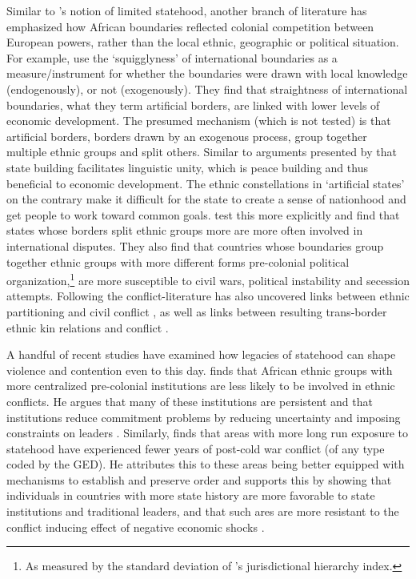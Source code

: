 
Similar to \citet{Clapham1996}'s notion of limited statehood, another branch of
literature has emphasized how African boundaries reflected colonial competition
between European powers, rather than the local ethnic, geographic or political
situation. For example, \citet{Alesina2011} use the `squigglyness' of
international boundaries as a measure/instrument for whether the boundaries were
drawn with local knowledge (endogenously), or not (exogenously). They find that
straightness of international boundaries, what they term artificial borders, are
linked with lower levels of economic development. The presumed mechanism (which
is not tested) is that artificial borders, borders drawn by an exogenous
process, group together multiple ethnic groups and split others. Similar to
arguments presented by \citet{Wimmer_2018} that state building facilitates
linguistic unity, which is peace building and thus beneficial to economic
development. The ethnic constellations in `artificial states' on the contrary
make it difficult for the state to create a sense of nationhood and get people
to work toward common goals. \citet{Englebert2002} test this more explicitly and
find that states whose borders split ethnic groups more are more often involved
in international disputes. They also find that countries whose boundaries group
together ethnic groups with more different forms pre-colonial political
organization,\footnote{As measured by the standard deviation of
\citet{Murdock1967}'s jurisdictional hierarchy index.} are more susceptible to
civil wars, political instability and secession attempts. Following
\citet{Englebert2002} the conflict-literature has also uncovered links between
ethnic partitioning and civil conflict \citep{Ito2020, Michalopoulos2016}, as
well as links between resulting trans-border ethnic kin relations and conflict
\citep{Cederman2013, Salehyan2009, Weidmann2015}. 

A handful of recent studies have examined how legacies of statehood can shape
violence and contention even to this day. \citet{Wig2016} finds that African
ethnic groups with more centralized pre-colonial institutions are less likely to
be involved in ethnic conflicts. He argues that many of these institutions are
persistent and that institutions reduce commitment problems by reducing
uncertainty and imposing constraints on leaders \citep{Wig2016}. Similarly,
\citet{Depetris-Chauvin2016} finds that areas with more long run exposure to
statehood have experienced fewer years of post-cold war conflict (of any type
coded by the GED). He attributes this to these areas being better equipped with
mechanisms to establish and preserve order and supports this by showing that
individuals in countries with more state history are more favorable to state
institutions and traditional leaders, and that such ares are more resistant to
the conflict inducing effect of negative economic shocks
\citep{Depetris-Chauvin2016}.

